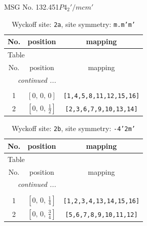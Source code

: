 \documentclass[fleqn,8pt]{jsarticle}
\begin{document}
\setcounter{MaxMatrixCols}{32}

\renewcommand{\tablename}{Table~}
\renewcommand{\figurename}{Figure~}
\begin{center}
\LARGE
MSG No. 132.451\quad$P4_{2}'/mcm'$
\end{center}
\renewcommand{\arraystretch}{1.2}
\begin{longtable}{ccc}
\caption{Wyckoff site: {\tt 2a}, site symmetry: {\tt m.m'm'}}
 \\
 \hline \hline
No. & position & mapping \\ \hline \endfirsthead

\multicolumn{2}{l}{\tablename\ \thetable{}} \\
 \hline \hline
No. & position & mapping \\ \hline \endhead

 \hline \hline
\multicolumn{2}{r}{\footnotesize\it continued ...} \\ \endfoot

 \hline \hline
\multicolumn{2}{r}{} \\ \endlastfoot

1 & $\left[ 0,\, 0,\, 0 \right]$ & {\tt [1,4,5,8,11,12,15,16]} \\ \hline
2 & $\left[ 0,\, 0,\, \frac{1}{2} \right]$ & {\tt [2,3,6,7,9,10,13,14]} \\
\end{longtable}
\renewcommand{\arraystretch}{1.2}
\begin{longtable}{ccc}
\caption{Wyckoff site: {\tt 2b}, site symmetry: {\tt -4'2m'}}
 \\
 \hline \hline
No. & position & mapping \\ \hline \endfirsthead

\multicolumn{2}{l}{\tablename\ \thetable{}} \\
 \hline \hline
No. & position & mapping \\ \hline \endhead

 \hline \hline
\multicolumn{2}{r}{\footnotesize\it continued ...} \\ \endfoot

 \hline \hline
\multicolumn{2}{r}{} \\ \endlastfoot

1 & $\left[ 0,\, 0,\, \frac{1}{4} \right]$ & {\tt [1,2,3,4,13,14,15,16]} \\ \hline
2 & $\left[ 0,\, 0,\, \frac{3}{4} \right]$ & {\tt [5,6,7,8,9,10,11,12]} \\
\end{longtable}
\end{document}
